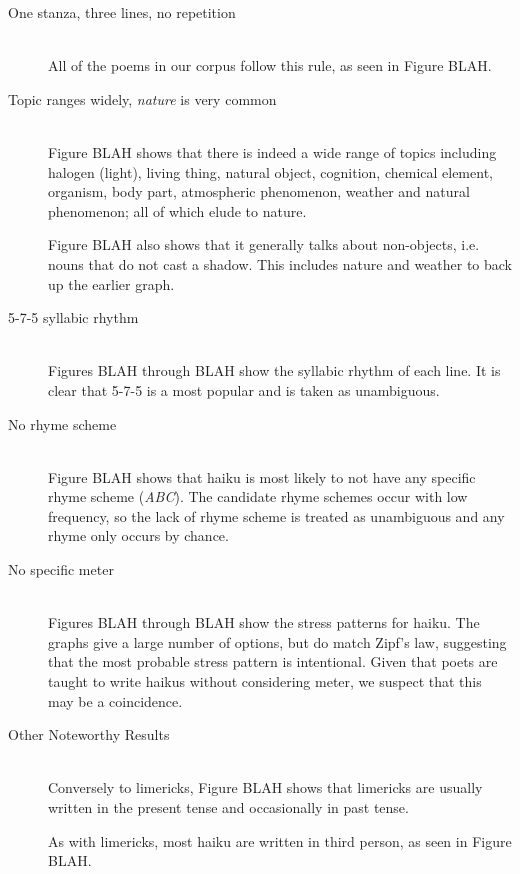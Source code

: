\begin{description}
\item[One stanza, three lines, no repetition]  \hfill \\
All of the poems in our corpus follow this rule, as seen in Figure BLAH.

\item[Topic ranges widely, \textit{nature} is very common]  \hfill \\
Figure BLAH shows that there is indeed a wide range of topics including halogen (light), living thing, natural object, cognition, chemical element, organism, body part, atmospheric phenomenon, weather and natural phenomenon; all of which elude to nature. 

Figure BLAH also shows that it generally talks about non-objects, i.e. nouns that do not cast a shadow. This includes nature and weather to back up the earlier graph.

\item[5-7-5 syllabic rhythm]  \hfill \\
Figures BLAH through BLAH show the syllabic rhythm of each line. It is clear that 5-7-5 is a most popular and is taken as unambiguous.

\item[No rhyme scheme]  \hfill \\
Figure BLAH shows that haiku is most likely to not have any specific rhyme scheme (\textit{ABC}). The candidate rhyme schemes occur with low frequency, so the lack of rhyme scheme is treated as unambiguous and any rhyme only occurs by chance.

\item[No specific meter]  \hfill \\
Figures BLAH through BLAH show the stress patterns for haiku. The graphs give a large number of options, but do match Zipf's law, suggesting that the most probable stress pattern is intentional. Given that poets are taught to write haikus without considering meter, we suspect that this may be a coincidence.

\item[Other Noteworthy Results]  \hfill \\
Conversely to limericks, Figure BLAH shows that limericks are usually written in the present tense and occasionally in past tense.

As with limericks, most haiku are written in third person, as seen in Figure BLAH.

\end{description}

